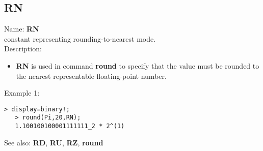 \subsection{ RN }
\noindent Name: \textbf{RN}\\
constant representing rounding-to-nearest mode.\\

\noindent Description: \begin{itemize}

\item \textbf{RN} is used in command \textbf{round} to specify that the value must be rounded
   to the nearest representable floating-point number.
\end{itemize}
\noindent Example 1: 
\begin{center}\begin{minipage}{14.8cm}\begin{Verbatim}[frame=single]
   > display=binary!;
   > round(Pi,20,RN);
   1.100100100001111111_2 * 2^(1)
\end{Verbatim}
\end{minipage}\end{center}
See also: \textbf{RD}, \textbf{RU}, \textbf{RZ}, \textbf{round}
